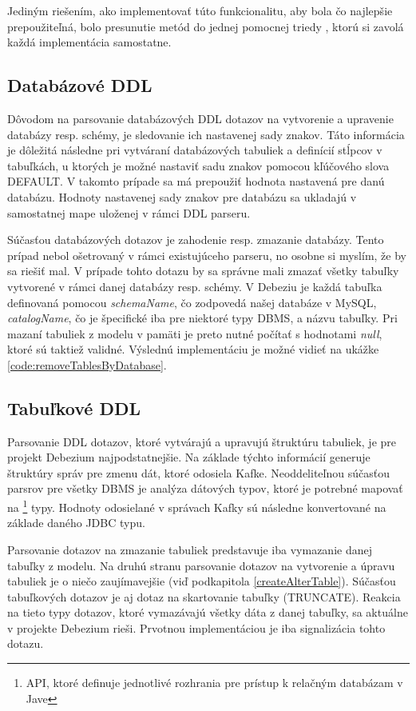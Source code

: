 Jediným riešením, ako implementovať túto funkcionalitu, aby bola čo najlepšie prepoužiteľná, bolo presunutie metód do jednej pomocnej triedy , ktorú si zavolá každá implementácia samostatne.

\subsection{Databázové DDL}
Dôvodom na parsovanie databázových DDL dotazov na vytvorenie a upravenie databázy resp. schémy, je sledovanie ich nastavenej sady znakov. Táto informácia je dôležitá následne pri vytváraní databázových tabuliek a definícií stĺpcov v tabuľkách, u ktorých je možné nastaviť sadu znakov pomocou kľúčového slova DEFAULT. V takomto prípade sa má prepoužiť hodnota nastavená pre danú databázu\cite{mysql:reference_manual}. Hodnoty nastavenej sady znakov pre databázu sa ukladajú v samostatnej mape uloženej v rámci DDL parseru.

Súčasťou databázových dotazov je zahodenie resp. zmazanie databázy. Tento prípad nebol ošetrovaný v rámci existujúceho parseru, no osobne si myslím, že by sa riešiť mal. V prípade tohto dotazu by sa správne mali zmazať všetky tabuľky vytvorené v rámci danej databázy resp. schémy. V Debeziu je každá tabuľka definovaná pomocou \textit{schemaName}, čo zodpovedá našej databáze v MySQL, \textit{catalogName}, čo je špecifické iba pre niektoré typy DBMS, a názvu tabuľky. Pri mazaní tabuliek z modelu v pamäti je preto nutné počítať s hodnotami \textit{null}, ktoré sú taktiež validné. Výslednú implementáciu je možné vidieť na ukážke \ref{code:removeTablesByDatabase}.

\subsection{Tabuľkové DDL}
Parsovanie DDL dotazov, ktoré vytvárajú a upravujú štruktúru tabuliek, je pre projekt Debezium najpodstatnejšie. Na základe týchto informácií generuje štruktúry správ pre zmenu dát, ktoré odosiela Kafke. Neoddeliteľnou súčasťou parsrov pre všetky DBMS je analýza dátových typov, ktoré je potrebné mapovať na \footnote{API, ktoré definuje jednotlivé rozhrania pre prístup k relačným databázam v Jave} typy. Hodnoty odosielané v správach Kafky sú následne konvertované na základe daného JDBC typu.

Parsovanie dotazov na zmazanie tabuliek predstavuje iba vymazanie danej tabuľky z modelu. Na druhú stranu parsovanie dotazov na vytvorenie a úpravu tabuliek je o niečo zaujímavejšie (viď podkapitola \ref{createAlterTable}). Súčasťou tabuľkových dotazov je aj dotaz na skartovanie tabuľky (TRUNCATE). Reakcia na tieto typy dotazov, ktoré vymazávajú všetky dáta z danej tabuľky, sa aktuálne v projekte Debezium rieši. Prvotnou implementáciou je iba signalizácia tohto dotazu.

